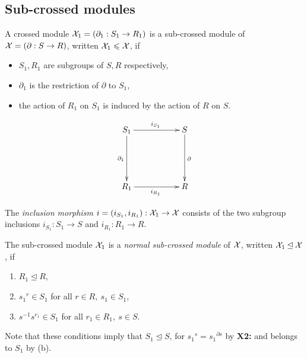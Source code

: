 \subsection{Sub-crossed modules} \label{subs:subxmods}

\begin{defn} 
A crossed module $\mathcal{X}_1 = (\partial_1 : S_1 \to R_1)$
is a sub-crossed module of $\mathcal{X} = (\partial : S \to R)$,
written $\mathcal{X}_1 \leqslant \mathcal{X}$, if
\begin{itemize}
\item $S_1,R_1$ are subgroups of $S,R$ respectively,
\item $\partial_1$ is the restriction of $\partial$ to $S_1$,
\item the action of $R_1$ on $S_1$ is induced by the action of $R$ on $S$.
\end{itemize}
\end{defn}

$$
\xymatrix{ 
  S_1 \ar[rr]^{i_{S_1}} \ar[dd]_{\partial_1}
     && S \ar[dd]^{\partial} \\
     &&  \\
  R_1 \ar[rr]_{i_{R_1}}
     && R
}
$$

\begin{defn}  
The \emph{inclusion morphism} 
$i = (i_{S_1},i_{R_1}) : \mathcal{X}_1 \to \mathcal{X}$
consists of the two subgroup inclusions
$i_{S_1} : S_1 \to S$ and $i_{R_1} : R_1 \to R$.
\end{defn}

\begin{defn}  
The sub-crossed module $\mathcal{X}_1$ is a 
\emph{normal sub-crossed module} of $\mathcal{X}$, 
written $\mathcal{X}_1 \unlhd \mathcal{X}$, if
\begin{enumerate}[{\rm (a)}]
\item $R_1 \unlhd R$,
\item ${s_1}^r \in S_1$ for all $r \in R,~ s_1 \in S_1$,
\item $s^{-1}s^{r_1} \in S_1$ for all $r_1 \in R_1,~ s \in S$.
\end{enumerate}
\end{defn}

\noindent
Note that these conditions imply that $S_1 \unlhd S$, 
for ${s_1}^s = {s_1}^{\partial s}$ by {\bf X2:} 
and belongs to $S_1$ by (b).

